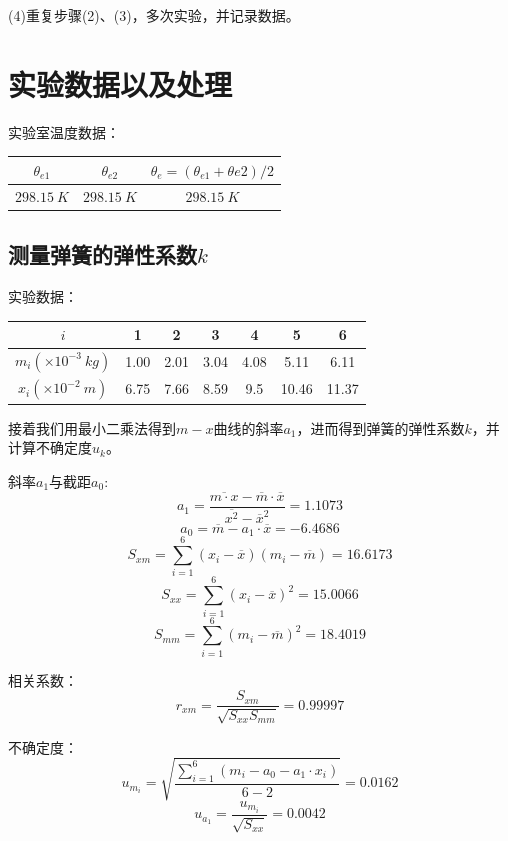 \documentclass{article}
\begin{document}
(4)重复步骤(2)、(3)，多次实验，并记录数据。

\section{实验数据以及处理}
实验室温度数据：
\begin{table}[!ht]
    \centering
    \begin{tabular}{ccc}
        \hline \hline
        $\theta_{e1}$ & $\theta_{e2}$ &  $\theta_e=(\theta_{e1}+\theta{e2})/2$\\\hline
        $298.15\ K$& $298.15\ K$& $298.15\ K$\\
        \hline \hline
    \end{tabular}
\end{table}

\subsection{测量弹簧的弹性系数$k$}
实验数据：
\begin{table}[!ht]
    \centering
    \begin{tabular}{ccccccc}
        \hline \hline
        $i$ & 1 &  2 & 3 & 4 & 5 & 6\\\hline
        $m_i(\times 10^{-3}\ kg)$ & 1.00&2.01&3.04&4.08&5.11&6.11\\
        $x_i(\times 10^{-2}\ m)$&6.75&7.66&8.59&9.5&10.46&11.37\\\hline \hline
    \end{tabular}
\end{table}

接着我们用最小二乘法得到$m-x$曲线的斜率$a_1$，进而得到弹簧的弹性系数$k$，并计算不确定度$u_k$。

斜率$a_1$与截距$a_0$:
$$
a_1=\frac{\overline{m\cdot x}-\overline{m}\cdot \overline{x}}{\overline{x^2}-\overline{x}^2}=1.1073
$$
$$
a_0=\overline{m}-a_1\cdot\overline{x}=-6.4686
$$
$$
S_{xm}=\sum_{i=1}^{6}(x_i-\overline{x})(m_i-\overline{m})=16.6173
$$
$$
S_{xx}=\sum_{i=1}^{6}{(x_i-\overline{x})^2}=15.0066
$$
$$
S_{mm}=\sum_{i=1}^{6}{(m_i-\overline{m})^2}=18.4019
$$

相关系数：
$$
r_{xm}=\frac{S_{xm}}{\sqrt{S_{xx}S_{mm}}}=0.99997
$$

不确定度：
$$
u_{m_i}=\sqrt{\frac{\sum_{i=1}^{6}{(m_i-a_0-a_1\cdot x_i)}}{6-2}}=0.0162
$$
$$
u_{a_1}=\frac{u_{m_i}}{\sqrt{S_{xx}}}=0.0042
$$    
\end{document}
